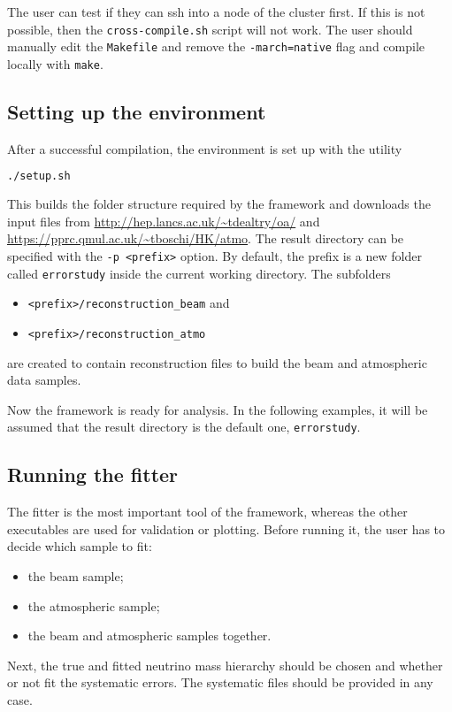 \documentclass[a4paper, 11pt]{article}
\begin{document}
The user can test if they can ssh into a node of the cluster first.
If this is not possible, then the \texttt{cross-compile.sh} script will not work.
The user should manually edit the \texttt{Makefile} and remove the \texttt{-march=native} flag and %
compile locally with \texttt{make}.

\subsection{Setting up the environment}

After a successful compilation, the environment is set up with the utility
\begin{lstlisting}[language=bash]
	./setup.sh
\end{lstlisting}
This builds the folder structure required by the framework and downloads the input files from %
\url{http://hep.lancs.ac.uk/~tdealtry/oa/} and \url{https://pprc.qmul.ac.uk/~tboschi/HK/atmo}.
The result directory can be specified with the \texttt{-p <prefix>} option.
By default, the prefix is a new folder called \texttt{errorstudy} inside the current working directory.
The subfolders
\begin{itemize}
		\small
	\item \texttt{<prefix>/reconstruction\_beam} and
	\item \texttt{<prefix>/reconstruction\_atmo}
\end{itemize}
are created to contain reconstruction files to build the beam and atmospheric data samples.

Now the framework is ready for analysis.
In the following examples, it will be assumed that the result directory is the default one, %
\texttt{errorstudy}.

\subsection{Running the fitter}

The fitter is the most important tool of the framework, %
whereas the other executables are used for validation or plotting.
Before running it, the user has to decide which sample to fit:
\begin{itemize}
	\item the beam sample;
	\item the atmospheric sample;
	\item the beam and atmospheric samples together.
\end{itemize}
Next, the true and fitted neutrino mass hierarchy should be chosen and whether or not %
fit the systematic errors.
The systematic files should be provided in any case.
\end{document}
